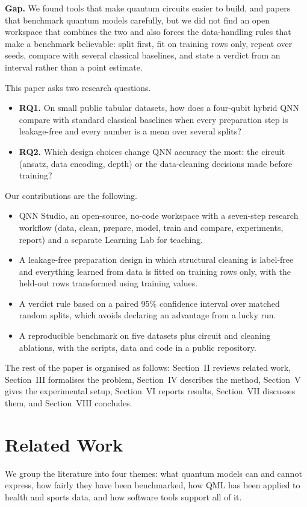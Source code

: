 \documentclass[12pt,onecolumn,draftclsnofoot]{IEEEtran}
\begin{document}
\textbf{Gap.} We found tools that make quantum circuits easier to build, and papers that benchmark quantum models carefully, but we did not find an open workspace that combines the two and also forces the data-handling rules that make a benchmark believable: split first, fit on training rows only, repeat over seeds, compare with several classical baselines, and state a verdict from an interval rather than a point estimate.

This paper asks two research questions.
\begin{itemize}
  \item \textbf{RQ1.} On small public tabular datasets, how does a four-qubit hybrid QNN compare with standard classical baselines when every preparation step is leakage-free and every number is a mean over several splits?
  \item \textbf{RQ2.} Which design choices change QNN accuracy the most: the circuit (ansatz, data encoding, depth) or the data-cleaning decisions made before training?
\end{itemize}

Our contributions are the following.
\begin{itemize}
  \item QNN Studio, an open-source, no-code workspace with a seven-step research workflow (data, clean, prepare, model, train and compare, experiments, report) and a separate Learning Lab for teaching.
  \item A leakage-free preparation design in which structural cleaning is label-free and everything learned from data is fitted on training rows only, with the held-out rows transformed using training values.
  \item A verdict rule based on a paired 95\% confidence interval over matched random splits, which avoids declaring an advantage from a lucky run.
  \item A reproducible benchmark on five datasets plus circuit and cleaning ablations, with the scripts, data and code in a public repository.
\end{itemize}

The rest of the paper is organised as follows: Section~II reviews related work, Section~III formalises the problem, Section~IV describes the method, Section~V gives the experimental setup, Section~VI reports results, Section~VII discusses them, and Section~VIII concludes.

\section{Related Work}
We group the literature into four themes: what quantum models can and cannot express, how fairly they have been benchmarked, how QML has been applied to health and sports data, and how software tools support all of it.
\end{document}
